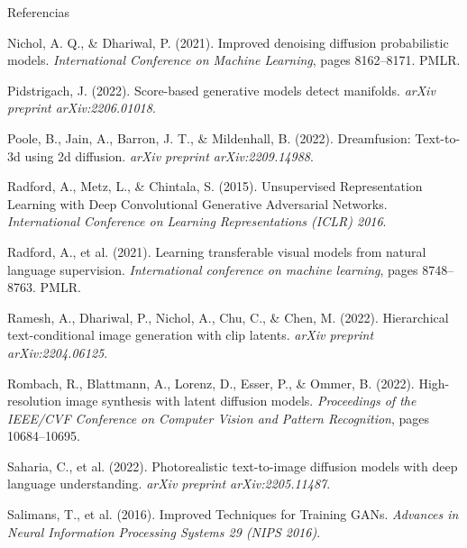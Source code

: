 \documentclass[aspectratio=169,xcolor=dvipsnames, t, spanish]{beamer}
\begin{document}
\begin{frame}{Referencias}
{\begin{thebibliography}{99}
             Nichol, A. Q., \& Dhariwal, P. (2021).
            \newblock Improved denoising diffusion probabilistic models.
            \newblock \emph{International Conference on Machine Learning}, pages 8162–8171. PMLR.

             Pidstrigach, J. (2022).
            \newblock Score-based generative models detect manifolds.
            \newblock \emph{arXiv preprint arXiv:2206.01018}.

             Poole, B., Jain, A., Barron, J. T., \& Mildenhall, B. (2022).
            \newblock Dreamfusion: Text-to-3d using 2d diffusion.
            \newblock \emph{arXiv preprint arXiv:2209.14988}.

             Radford, A., Metz, L., \& Chintala, S. (2015).
            \newblock Unsupervised Representation Learning with Deep Convolutional Generative Adversarial Networks.
            \newblock \emph{International Conference on Learning Representations (ICLR) 2016}.

             Radford, A., et al. (2021).
            \newblock Learning transferable visual models from natural language supervision.
            \newblock \emph{International conference on machine learning}, pages 8748–8763. PMLR.

             Ramesh, A., Dhariwal, P., Nichol, A., Chu, C., \& Chen, M. (2022).
            \newblock Hierarchical text-conditional image generation with clip latents.
            \newblock \emph{arXiv preprint arXiv:2204.06125}.

             Rombach, R., Blattmann, A., Lorenz, D., Esser, P., \& Ommer, B. (2022).
            \newblock High-resolution image synthesis with latent diffusion models.
            \newblock \emph{Proceedings of the IEEE/CVF Conference on Computer Vision and Pattern Recognition}, pages 10684–10695.
            
             Saharia, C., et al. (2022).
            \newblock Photorealistic text-to-image diffusion models with deep language understanding.
            \newblock \emph{arXiv preprint arXiv:2205.11487}.

             Salimans, T., et al. (2016).
            \newblock Improved Techniques for Training GANs.
            \newblock \emph{Advances in Neural Information Processing Systems 29 (NIPS 2016)}.
            

\end{thebibliography}}
\end{frame}
\end{document}
